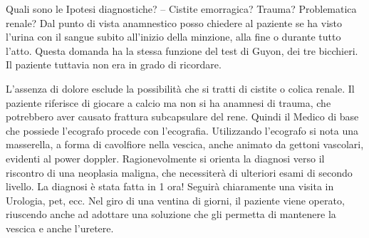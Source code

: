 \documentclass[]{article}
\begin{document}
Quali sono le Ipotesi diagnostiche? -- Cistite emorragica? Trauma?
Problematica renale? Dal punto di vista anamnestico posso chiedere al
paziente se ha visto l'urina con il sangue subito all'inizio della
minzione, alla fine o durante tutto l'atto. Questa domanda ha la stessa
funzione del test di Guyon, dei tre bicchieri. Il paziente tuttavia non
era in grado di ricordare.

L'assenza di dolore esclude la possibilità che si tratti di cistite o
colica renale. Il paziente riferisce di giocare a calcio ma non si ha
anamnesi di trauma, che potrebbero aver causato frattura subcapsulare
del rene. Quindi il Medico di base che possiede l'ecografo procede con
l'ecografia. Utilizzando l'ecografo si nota una masserella, a forma di
cavolfiore nella vescica, anche animato da gettoni vascolari, evidenti
al power doppler. Ragionevolmente si orienta la diagnosi verso il
riscontro di una neoplasia maligna, che necessiterà di ulteriori esami
di secondo livello. La diagnosi è stata fatta in 1 ora! Seguirà
chiaramente una visita in Urologia, pet, ecc. Nel giro di una ventina di
giorni, il paziente viene operato, riuscendo anche ad adottare una
soluzione che gli permetta di mantenere la vescica e anche l'uretere.
\end{document}
